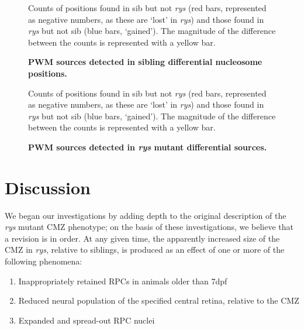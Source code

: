 \begin{figure}[!h]
    \caption{{\bf PWM sources detected in sibling differential nucleosome positions.}}
    Counts of positions found in sib but not \textit{rys} (red bars, represented as negative numbers, as these are `lost' in \textit{rys}) and those found in \textit{rys} but not sib (blue bars, `gained'). The magnitude of the difference between the counts is represented with a yellow bar.
    \label{sibmotifs}
\end{figure}

\begin{figure}[!h]
    \caption{{\bf PWM sources detected in \textit{rys} mutant differential sources.}}
    Counts of positions found in sib but not \textit{rys} (red bars, represented as negative numbers, as these are `lost' in \textit{rys}) and those found in \textit{rys} but not sib (blue bars, `gained'). The magnitude of the difference between the counts is represented with a yellow bar.
    \label{rysmotifs}
\end{figure}

\FloatBarrier

\section{Discussion}
We began our investigations by adding depth to the original description of the \textit{rys} mutant CMZ phenotype; on the basis of these investigations, we believe that a revision is in order. At any given time, the apparently increased size of the CMZ in \textit{rys}, relative to siblings, is produced as an effect of one or more of the following phenomena:

\begin{enumerate}
\item\label{inapret} Inappropriately retained RPCs in animals older than 7dpf
\item\label{specfail} Reduced neural population of the specified central retina, relative to the CMZ
\item\label{chromo} Expanded and spread-out RPC nuclei
\end{enumerate}

